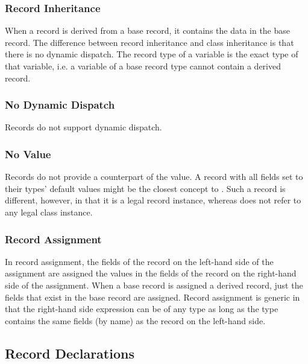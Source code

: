 \subsubsection{Record Inheritance}
\label{Record_Inheritance}

When a record is derived from a base record, it contains the data in
the base record.  The difference between record inheritance and class
inheritance is that there is no dynamic dispatch.  The record type of
a variable is the exact type of that variable, i.e. a variable of a
base record type cannot contain a derived record.

\subsubsection{No Dynamic Dispatch}

Records do not support dynamic dispatch.

\subsubsection{No  Value}

Records do not provide a counterpart of the  value.  A record
with all fields set to their types' default values might be the closest
concept to . Such a record is different, however, in that it is
a legal record instance, whereas  does not refer to any
legal class instance.

\subsubsection{Record Assignment}
\label{Record_Assignment}

In record assignment, the fields of the record on the left-hand side
of the assignment are assigned the values in the fields of the record
on the right-hand side of the assignment.  When a base record is
assigned a derived record, just the fields that exist in the base
record are assigned.  Record assignment is generic in that the
right-hand side expression can be of any type as long as the type
contains the same fields (by name) as the record on the left-hand
side.

\subsection{Record Declarations}
\label{Record_Declarations}

